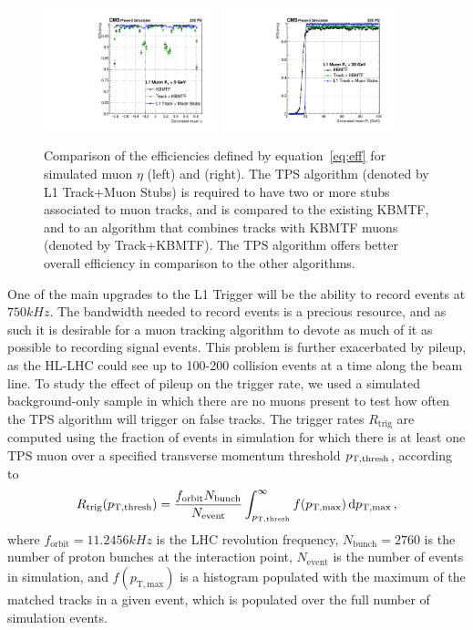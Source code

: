 \begin{figure}[htbp] %
  \centering
  \includegraphics[width=0.45\textwidth]{fig/TPS/effVsEta_5_TPS.pdf}
  \includegraphics[width=0.45\textwidth]{fig/TPS/effVsPt_20_TPS.pdf}
  \caption{
    Comparison of the efficiencies defined by equation~\ref{eq:eff} for simulated muon $\eta$ (left) and \pt (right).
    The TPS algorithm (denoted by L1 Track+Muon Stubs) is required to have two or more stubs associated to muon tracks, and is compared to the existing KBMTF, and to an algorithm that combines tracks with KBMTF muons (denoted by Track+KBMTF).
    The TPS algorithm offers better overall efficiency in comparison to the other algorithms.
  }
  \label{fig:eff}
\end{figure}

One of the main upgrades to the L1 Trigger will be the ability to record events at $750\unit{kHz}$.
The bandwidth needed to record events is a precious resource, and as such it is desirable for a muon tracking algorithm to devote as much of it as possible to recording signal events.
This problem is further exacerbated by pileup, as the HL-LHC could see up to 100-200 collision events at a time along the beam line.
To study the effect of pileup on the trigger rate, we used a simulated background-only sample in which there are no muons present to test how often the TPS algorithm will trigger on false tracks.
The trigger rates $R_\mathrm{trig}$ are computed using the fraction of events in simulation for which there is at least one TPS muon over a specified transverse momentum threshold $p_\mathrm{T,thresh}$, according to
\begin{equation}
  R_\mathrm{trig}(p_\mathrm{T,thresh})=\frac{f_\mathrm{orbit}N_\mathrm{bunch}}{N_\mathrm{event}}\int_{p_\mathrm{T,thresh}}^\infty f(p_\mathrm{T,max})\dd{p_\mathrm{T,max}},
\end{equation}
where $f_\mathrm{orbit}=11.2456\unit{kHz}$ is the LHC revolution frequency, $N_\mathrm{bunch}=2760$ is the number of proton bunches at the interaction point, $N_\mathrm{event}$ is the number of events in simulation, and $f(p_\mathrm{T,max})$ is a histogram populated with the maximum \pt of the matched tracks in a given event, which is populated over the full number of simulation events.

